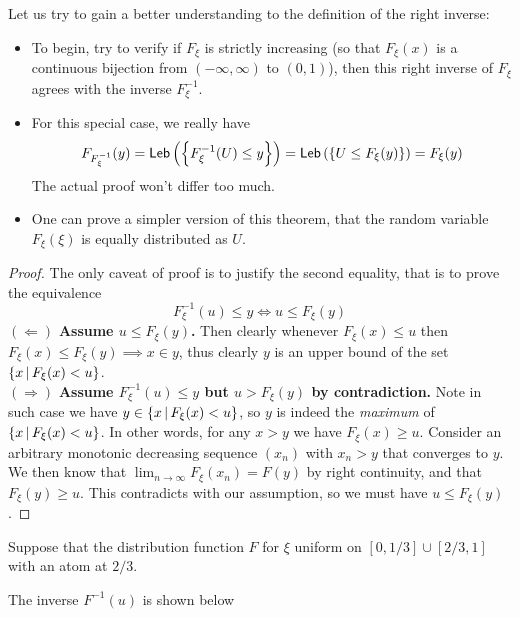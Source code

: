 \begin{hint}
Let us try to gain a better understanding to the definition of the right inverse: 
\begin{itemize}
    \item To begin, try to verify if $F_\xi$ is strictly increasing (so that $F_\xi(x)$ is a continuous bijection from $(-\infty,\infty)$ to $(0,1)$), then this right inverse of $F_\xi$ agrees with the inverse $F^{-1}_\xi$.
    \item For this special case, we really have
    \begin{align} \label{eq:prob_transform_cts}
        F_{F^{-1}_\xi}(y) = \mathsf{Leb}\left( \left\{ F^{-1}_\xi(U) \le y \right \} \right) = \mathsf{Leb}\left( \left\{ U \leq F_\xi(y) \right \} \right) = F_\xi(y)
    \end{align}
    The actual proof won't differ too much.
    \item One can prove a simpler version of this theorem, that the random variable $F_\xi(\xi)$ is equally distributed as $U$.
\end{itemize}
\end{hint}

\begin{proof}
The only caveat of proof is to justify the second equality, that is to prove the equivalence
\begin{equation*}
    F^{-1}_\xi(u) \leq y \iff u \leq F_\xi(y)
\end{equation*}
$(\Leftarrow)$ \textbf{Assume $u \leq F_\xi(y)$.} Then clearly whenever $F_\xi(x) \leq u$ then $F_\xi(x) \leq F_\xi(y) \implies x \in y$, thus clearly $y$ is an upper bound of the set $\left\{ x \,|\, F_\xi(x) < u \right \}$. \\

$(\Rightarrow)$ \textbf{Assume $F_\xi^{-1}(u) \leq y$ but $u > F_\xi(y)$ by contradiction.} Note in such case we have $y \in \left\{ x\,|\, F_\xi(x) < u \right \}$, so $y$ is indeed the \textit{maximum} of $\left\{ x\,|\, F_\xi(x) < u \right \}$. In other words, for any $x > y$ we have $F_\xi(x) \geq u$. Consider an arbitrary monotonic decreasing sequence $(x_n)$ with $x_n > y$ that converges to $y$. We then know that $\lim_{n\to \infty} F_\xi(x_n) = F(y)$ by right continuity, and that $F_\xi(y) \geq u$. This contradicts with our assumption, so we must have $u \leq F_\xi(y)$.
\end{proof}

\begin{example}
Suppose that the distribution function $F$ for $\xi$ uniform on $[0, 1/3] \cup [2/3, 1]$ with an atom at $2/3$. 
\begin{center}
    
\end{center}
The inverse $F^{-1}(u)$ is shown below
\begin{center}
    
\end{center}
\end{example}

